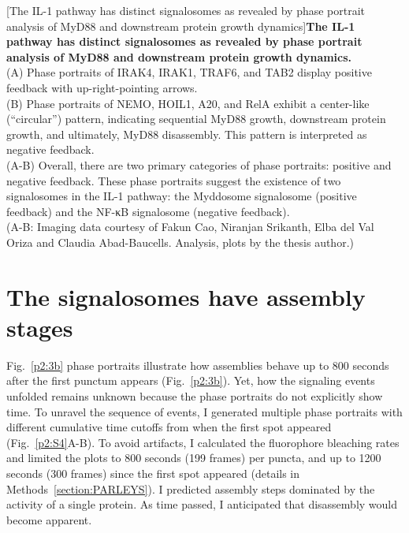\begin{centering}
\captionsetup{parbox=none}
[The IL-1 pathway has distinct signalosomes as revealed by phase portrait analysis of MyD88 and downstream protein growth dynamics]{\textbf{The IL-1 pathway has distinct signalosomes as revealed by phase portrait analysis of MyD88 and downstream protein growth dynamics.} 
\vspace{1em}
\\
(A) Phase portraits of IRAK4, IRAK1, TRAF6, and TAB2 display positive feedback with up-right-pointing arrows.
\vspace{1em}
\\
(B) Phase portraits of NEMO, HOIL1, A20, and RelA exhibit a center-like (“circular”) pattern, indicating sequential MyD88 growth, downstream protein growth, and ultimately, MyD88 disassembly. This pattern is interpreted as negative feedback.
\vspace{1em}
\\
(A-B) Overall, there are two primary categories of phase portraits: positive and negative feedback. These phase portraits suggest the existence of two signalosomes in the IL-1 pathway: the Myddosome signalosome (positive feedback) and the NF-κB signalosome (negative feedback).
\vspace{1em}
\\
(A-B: Imaging data courtesy of Fakun Cao, Niranjan Srikanth, Elba del Val Oriza and Claudia Abad-Baucells. Analysis, plots by the thesis author.)}
\label{p2:3b}
\end{centering}

\section{The signalosomes have assembly stages}
Fig.~\ref{p2:3b} phase portraits illustrate how assemblies behave up to 800 seconds after the first punctum appears (Fig.~\ref{p2:3b}). Yet, how the signaling events unfolded remains unknown because the phase portraits do not explicitly show time. To unravel the sequence of events, I generated multiple phase portraits with different cumulative time cutoffs from when the first spot appeared (Fig.~\ref{p2:S4}A-B). To avoid artifacts, I calculated the fluorophore bleaching rates and limited the plots to 800 seconds (199 frames) per puncta, and up to 1200 seconds (300 frames) since the first spot appeared (details in Methods~\ref{section:PARLEYS}). I predicted assembly steps dominated by the activity of a single protein. As time passed, I anticipated that disassembly would become apparent. 

